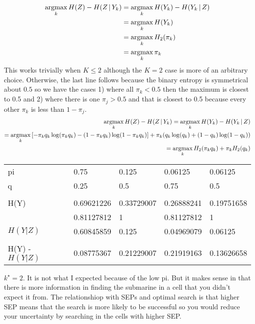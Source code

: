 \documentclass[hidequestions]{homework}
\begin{document}
\problem 
\subproblem 
\begin{align*}
    \mathop{\mathrm{argmax}}_k H(Z) - H(Z\,\vert\, Y_k) &= \mathop{\mathrm{argmax}}_k H(Y_k) - H(Y_k \,\vert\, Z)\\
    &= \mathop{\mathrm{argmax}}_k H(Y_k)\\
    &= \mathop{\mathrm{argmax}}_k H_2(\pi_k)\\
    &= \mathop{\mathrm{argmax}}_k \pi_k
\end{align*}
This works trivially when $K\leq2$ although the $K=2$ case is more of an arbitrary choice. Otherwise, the last line follows because the binary entropy is symmetrical about $0.5$ so we have the cases 1) where all $\pi_k < 0.5$ then the maximum is closest to 0.5 and 2) where there is one $\pi_j > 0.5$ and that is closest to 0.5 because every other $\pi_k$ is less than $1-\pi_j$.
\subproblem
\begin{align*}
    \mathop{\mathrm{argmax}}_k H(Z) - H(Z\,\vert\, Y_k) = \mathop{\mathrm{argmax}}_k H(Y_k) - H(Y_k \,\vert\, Z)\\
    = \mathop{\mathrm{argmax}}_k \left[-\pi_k q_k \log(\pi_k q_k) - (1-\pi_k q_k)\log(1-\pi_k q_k) \right] + 
    \pi_k(q_k \log(q_k) + (1-q_k)\log(1-q_k))\\
    = \mathop{\mathrm{argmax}}_k H_2(\pi_k q_k) + \pi_k H_2(q_k)\\
\end{align*}
\subproblem
\begin{table}[!h]
    \centering
    \begin{tabular}{lllll}
    pi            & 0.75       & 0.125      & 0.06125    & 0.06125    \\
    q             & 0.25       & 0.5        & 0.75       & 0.5        \\
                  &            &            &            &            \\
    H(Y)          & 0.69621226 & 0.33729007 & 0.26888241 & 0.19751658 \\
                  & 0.81127812 & 1          & 0.81127812 & 1          \\
    $H(Y|Z)$        & 0.60845859 & 0.125      & 0.04969079 & 0.06125    \\
                  &            &            &            &            \\
    H(Y) - $H(Y|Z)$ & 0.08775367 & 0.21229007 & 0.21919163 & 0.13626658
    \end{tabular}

    \end{table}
    $k^\star = 2$. It is not what I expected because of the low pi. But it makes sense in that there is more information in finding the submarine in a cell that you didn't expect it from. The relationshiop with SEPs and optimal search is that higher SEP means that the search is more likely to be successful so you would reduce your uncertainty by searching in the cells with higher SEP.
\end{document}

